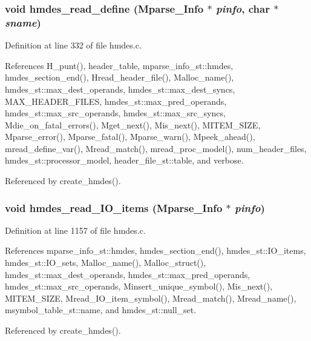 \subsubsection{\setlength{\rightskip}{0pt plus 5cm}void hmdes\_\-read\_\-define (\bf{Mparse\_\-Info} $\ast$ {\em pinfo}, char $\ast$ {\em sname})}\label{hmdes_8c_a3f0d60b373219c49efda8d55324f992}




Definition at line 332 of file hmdes.c.

References H\_\-punt(), header\_\-table, mparse\_\-info\_\-st::hmdes, hmdes\_\-section\_\-end(), Hread\_\-header\_\-file(), Malloc\_\-name(), hmdes\_\-st::max\_\-dest\_\-operands, hmdes\_\-st::max\_\-dest\_\-syncs, MAX\_\-HEADER\_\-FILES, hmdes\_\-st::max\_\-pred\_\-operands, hmdes\_\-st::max\_\-src\_\-operands, hmdes\_\-st::max\_\-src\_\-syncs, Mdie\_\-on\_\-fatal\_\-errors(), Mget\_\-next(), Mis\_\-next(), MITEM\_\-SIZE, Mparse\_\-error(), Mparse\_\-fatal(), Mparse\_\-warn(), Mpeek\_\-ahead(), mread\_\-define\_\-var(), Mread\_\-match(), mread\_\-proc\_\-model(), num\_\-header\_\-files, hmdes\_\-st::processor\_\-model, header\_\-file\_\-st::table, and verbose.

Referenced by create\_\-hmdes().
\subsubsection{\setlength{\rightskip}{0pt plus 5cm}void hmdes\_\-read\_\-IO\_\-items (\bf{Mparse\_\-Info} $\ast$ {\em pinfo})}\label{hmdes_8c_f5c6d475d646d0b90cc6f70e003c9bb8}




Definition at line 1157 of file hmdes.c.

References mparse\_\-info\_\-st::hmdes, hmdes\_\-section\_\-end(), hmdes\_\-st::IO\_\-items, hmdes\_\-st::IO\_\-sets, Malloc\_\-name(), Malloc\_\-struct(), hmdes\_\-st::max\_\-dest\_\-operands, hmdes\_\-st::max\_\-pred\_\-operands, hmdes\_\-st::max\_\-src\_\-operands, Minsert\_\-unique\_\-symbol(), Mis\_\-next(), MITEM\_\-SIZE, Mread\_\-IO\_\-item\_\-symbol(), Mread\_\-match(), Mread\_\-name(), msymbol\_\-table\_\-st::name, and hmdes\_\-st::null\_\-set.

Referenced by create\_\-hmdes().

